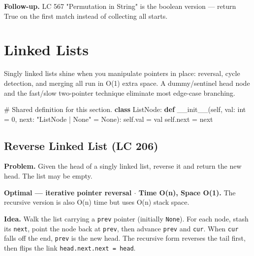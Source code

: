 \documentclass[11pt]{article}
\newenvironment{Shaded}{\begin{snugshade}}{\end{snugshade}}
\newcommand{\BuiltInTok}[1]{\textcolor[rgb]{0.50,0.55,0.55}{#1}}
\newcommand{\CommentTok}[1]{\textcolor[rgb]{0.48,0.49,0.49}{#1}}
\newcommand{\DecValTok}[1]{\textcolor[rgb]{0.96,0.45,0.00}{#1}}
\newcommand{\FunctionTok}[1]{\textcolor[rgb]{0.56,0.27,0.68}{#1}}
\newcommand{\KeywordTok}[1]{\textcolor[rgb]{0.81,0.81,0.76}{\textbf{#1}}}
\newcommand{\NormalTok}[1]{\textcolor[rgb]{0.81,0.81,0.76}{#1}}
\newcommand{\OperatorTok}[1]{\textcolor[rgb]{0.81,0.81,0.76}{#1}}
\newcommand{\StringTok}[1]{\textcolor[rgb]{0.96,0.31,0.31}{#1}}
\newcommand{\VariableTok}[1]{\textcolor[rgb]{0.15,0.68,0.68}{#1}}
\begin{document}
\textbf{Follow-up.} LC 567 "Permutation in String" is the boolean version --- return True on the first match instead of collecting all starts.

\section{Linked Lists}\label{linked-lists}

Singly linked lists shine when you manipulate pointers in place: reversal, cycle detection, and merging all run in O(1) extra space. A dummy/sentinel head node and the fast/slow two-pointer technique eliminate most edge-case branching.


\begin{Shaded}
\begin{Highlighting}[]
\CommentTok{\# Shared definition for this section.}
\KeywordTok{class}\NormalTok{ ListNode:}
    \KeywordTok{def} \FunctionTok{\_\_init\_\_}\NormalTok{(}\VariableTok{self}\NormalTok{, val: }\BuiltInTok{int} \OperatorTok{=} \DecValTok{0}\NormalTok{, }\BuiltInTok{next}\NormalTok{: }\StringTok{"ListNode | None"} \OperatorTok{=} \VariableTok{None}\NormalTok{):}
        \VariableTok{self}\NormalTok{.val }\OperatorTok{=}\NormalTok{ val}
        \VariableTok{self}\NormalTok{.}\BuiltInTok{next} \OperatorTok{=} \BuiltInTok{next}
\end{Highlighting}
\end{Shaded}

\subsection{Reverse Linked List (LC 206)}\label{reverse-linked-list-lc-206}

\textbf{Problem.} Given the head of a singly linked list, reverse it and return the new head. The list may be empty.

\textbf{Optimal --- iterative pointer reversal \(\cdot\) Time O(n), Space O(1).} The recursive version is also O(n) time but uses O(n) stack space.

\textbf{Idea.} Walk the list carrying a \texttt{prev} pointer (initially \texttt{None}). For each node, stash its \texttt{next}, point the node back at \texttt{prev}, then advance \texttt{prev} and \texttt{cur}. When \texttt{cur} falls off the end, \texttt{prev} is the new head. The recursive form reverses the tail first, then flips the link \texttt{head.next.next\ =\ head}.
\end{document}
